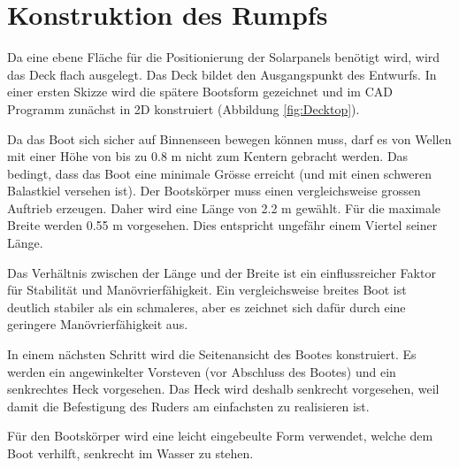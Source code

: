 \section{Konstruktion des Rumpfs}
Da eine ebene Fläche für die Positionierung der Solarpanels benötigt wird, wird das Deck flach ausgelegt. Das Deck bildet den Ausgangspunkt des Entwurfs. In einer ersten Skizze wird die spätere Bootsform gezeichnet und im CAD Programm zunächst in 2D konstruiert (Abbildung \ref{fig:Decktop}). 

Da das Boot sich sicher auf Binnenseen bewegen können muss, darf es von Wellen mit einer Höhe von bis zu 0.8 m nicht zum Kentern gebracht werden. Das bedingt, dass das Boot eine minimale Grösse erreicht (und mit einen schweren Balastkiel versehen ist). Der Bootskörper muss einen vergleichsweise grossen Auftrieb erzeugen. Daher wird eine Länge von 2.2 m gewählt. Für die maximale Breite werden 0.55 m vorgesehen. Dies entspricht ungefähr einem Viertel seiner Länge. 

Das Verhältnis zwischen der Länge und der Breite ist ein einflussreicher Faktor für Stabilität und Manövrierfähigkeit. Ein vergleichsweise breites Boot ist deutlich stabiler als ein schmaleres, aber es zeichnet sich dafür durch eine geringere Manövrierfähigkeit aus. \cite{Seemannschaft}


In einem nächsten Schritt wird die Seitenansicht des Bootes konstruiert. Es werden ein angewinkelter Vorsteven (vor Abschluss des Bootes) und ein senkrechtes Heck vorgesehen. Das Heck wird deshalb senkrecht vorgesehen, weil damit die Befestigung des Ruders am einfachsten zu realisieren ist.



Für den Bootskörper wird eine leicht eingebeulte Form verwendet, welche dem Boot verhilft, senkrecht im Wasser zu stehen.

